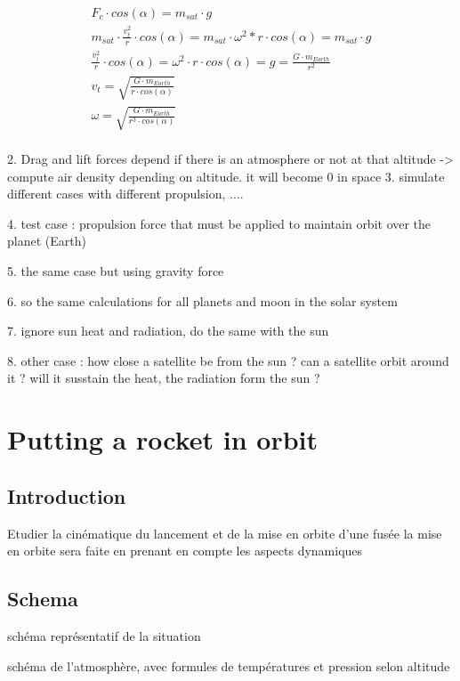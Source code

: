 \documentclass[12pt,a4paper]{article}
\begin{document}
\begin{eqnarray}
	F_c\cdot cos(\alpha) = m_{sat} \cdot g \\
	m_{sat} \cdot \frac{v_t^2}{r} \cdot cos(\alpha) = m_{sat} \cdot \omega^2 * r \cdot cos(\alpha)= m_{sat} \cdot g\\
	\frac{v_t^2}{r} \cdot cos(\alpha) = \omega^2 \cdot r \cdot cos(\alpha) = g =\frac{ G \cdot m_{Earth}}{r^2}\\
	v_t = \sqrt{\frac{ G \cdot m_{Earth}}{r\cdot cos(\alpha)}}\\
	\omega = \sqrt{\frac{ G \cdot m_{Earth}}{r^3\cdot cos(\alpha)}}\\
\end{eqnarray}

2. Drag and lift forces depend if there is an atmosphere or not at that altitude
-> compute air density depending on altitude. it will become 0 in space
3. simulate different cases with different propulsion, ....

4. test case : propulsion force that must be applied to maintain orbit over the planet (Earth)

5. the same case but using gravity force

6. so the same calculations for all planets and moon in the solar system

7. ignore sun heat and radiation, do the same with the sun 


8. other case : how close a satellite be from the sun ? can a satellite orbit around it ? will it susstain the heat, the radiation form the sun ?

\section{Putting a rocket in orbit}

\subsection{Introduction}

Etudier la cinématique du lancement et de la mise en orbite d'une fusée
\medbreak
la mise en orbite sera faite en prenant en compte les aspects dynamiques


\subsection{Schema}
schéma représentatif de la situation

schéma de l'atmosphère, avec formules de températures et pression selon altitude
\end{document}
